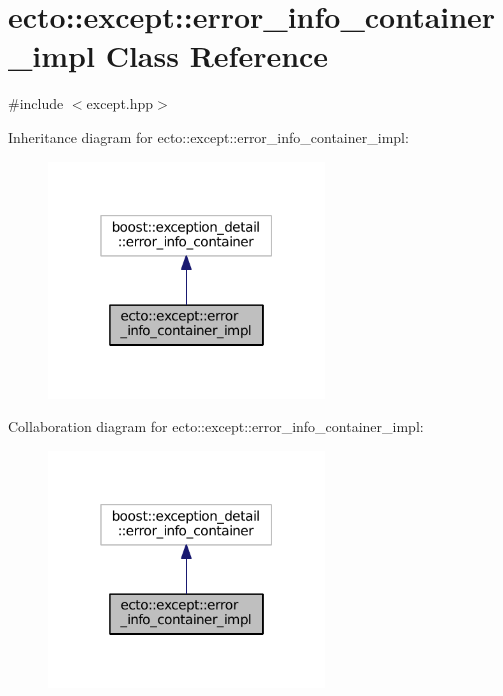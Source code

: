 \hypertarget{classecto_1_1except_1_1error__info__container__impl}{}\section{ecto\+:\+:except\+:\+:error\+\_\+info\+\_\+container\+\_\+impl Class Reference}
\label{classecto_1_1except_1_1error__info__container__impl}


{\ttfamily \#include $<$except.\+hpp$>$}



Inheritance diagram for ecto\+:\+:except\+:\+:error\+\_\+info\+\_\+container\+\_\+impl\+:\nopagebreak
\begin{figure}[H]
\begin{center}
\leavevmode
\includegraphics[width=208pt]{classecto_1_1except_1_1error__info__container__impl__inherit__graph}
\end{center}
\end{figure}


Collaboration diagram for ecto\+:\+:except\+:\+:error\+\_\+info\+\_\+container\+\_\+impl\+:\nopagebreak
\begin{figure}[H]
\begin{center}
\leavevmode
\includegraphics[width=208pt]{classecto_1_1except_1_1error__info__container__impl__coll__graph}
\end{center}
\end{figure}
